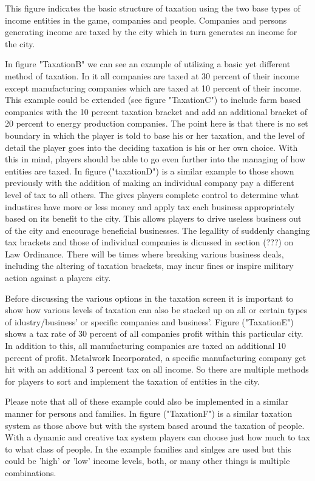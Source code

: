 This figure indicates the basic structure of taxation using the two base types of income entities in the game, companies and people. Companies and persons generating income are taxed by the city which in turn generates an income for the city.  

In figure "TaxationB" we can see an example of utilizing a basic yet different method of taxation. In it all companies are taxed at 30 percent of their income except manufacturing companies which are taxed at 10 percent of their income. This example could be extended (see figure "TaxationC") to include farm based companies with the 10 percent taxation bracket and add an additional bracket of 20 percent to energy production companies. The point here is that there is no set boundary in which the player is told to base his or her taxation, and the level of detail the player goes into the deciding taxation is his or her own choice. With this in mind, players should be able to go even further into the managing of how entities are taxed. 
In figure ("taxationD") is a similar example to those shown previously with the addition of making an individual company pay a different level of tax to all others. The gives players complete control to determine what industires have more or less money and apply tax each business appropriately based on its benefit to the city. This allows players to drive useless business out of the city and encourage beneficial businesses. The legallity of suddenly changing tax brackets and those of individual companies is dicussed in section (???) on Law Ordinance. There will be times where breaking various business deals, including the altering of taxation brackets, may incur fines or inspire military action against a players city.

Before discussing the various options in the taxation screen it is important to show how various levels of taxation can also be stacked up on all or certain types of idustry/business' or specific companies and business'.
Figure ("TaxationE") shows a tax rate of 30 percent of all companies profit within this particular city. In addition to this, all manufacturing companies are taxed an additional 10 percent of profit. Metalwork Incorporated, a specific manufacturing company get hit with an additional 3 percent tax on all income. So there are multiple methods for players to sort and implement the taxation of entities in the city. 

Please note that all of these example could also be implemented in a similar manner for persons and families. In figure ("TaxationF") is a similar taxation system as those above but with the system based around the taxation of people. With a dynamic and creative tax system players can choose just how much to tax to what class of people. In the example families and sinlges are used but this could be 'high' or 'low' income levels, both, or many other things is multiple combinations.

